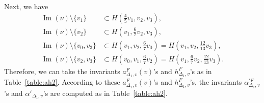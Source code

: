 \documentclass[11pt]{article}
\theoremstyle{definition}
\numberwithin{equation}{section}
\begin{document}
Next, we have 
\begin{align*}
\operatorname{Im}(\nu) \setminus \{ v_1 \} &\subset H \left( \frac{4}{5} v_1 , v_2, v_3 \right), \\
\operatorname{Im}(\nu) \setminus \{ v_2 \} &\subset H \left( v_1 , \frac{6}{7} v_2, v_3 \right), \\
\operatorname{Im}(\nu) \setminus \{ v_0, v_3 \} &\subset H \left( v_1 , v_2, \frac{6}{7}v_0 \right) = H \left( v_1 , v_2, \frac{12}{13} v_3 \right), \\
\operatorname{Im}(\nu) \setminus \{ v_2, v_3 \} &\subset H \left( v_0 , v_1, \frac{6}{7}v_2 \right) = H \left( v_1 , \frac{6}{7} v_2, \frac{12}{13} v_3 \right). 
\end{align*}
Therefore, we can take the invariants $a_{\Delta _1, v}^F (v)$'s and $h_{\Delta _1, v}^F$'s as in Table~\ref{table:ah2}. 
According to these $a_{\Delta _1, v}^F (v)$'s and $h_{\Delta _1, v}^F$'s, 
the invariants $\alpha^{\prime F} _{\Delta _1, v}$'s and $\alpha' _{\Delta _1, v}$'s are computed as in Table~\ref{table:ah2}. 
\end{document}
